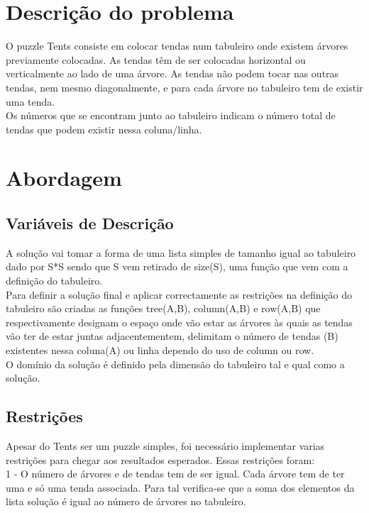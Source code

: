 \documentclass[runningheads,a4paper]{llncs}
\begin{document}
\section{Descrição do problema}
O puzzle Tents consiste em colocar tendas num tabuleiro onde existem árvores previamente colocadas. As tendas têm de ser colocadas horizontal ou verticalmente ao lado de uma árvore. As tendas não podem tocar nas outras tendas, nem mesmo diagonalmente, e para cada árvore no tabuleiro tem de existir uma tenda. \\
Os números que se encontram junto ao tabuleiro indicam o número total de tendas que podem existir nessa coluna/linha.\\


\section{Abordagem}

\subsection{Variáveis de Descrição}

A solução vai tomar a  forma de uma lista simples  de tamanho igual ao tabuleiro dado por S*S sendo que S vem retirado de size(S), uma função que vem com a definição do tabuleiro.\\
	Para definir a solução final e aplicar correctamente as restrições na definição do tabuleiro são criadas as funções tree(A,B),  column(A,B) e row(A,B) que respectivamente designam o espaço onde vão estar as árvores às quais as tendas vão ter de estar juntas adjacentementem, delimitam o número de tendas (B) existentes nessa coluna(A) ou linha dependo do uso de column ou row.\\
	O domínio da solução é definido  pela dimensão do tabuleiro tal e qual como a solução.




\subsection{Restrições}

Apesar do Tents ser um puzzle simples, foi necessário implementar varias restrições para chegar aos resultados esperados. Essas restrições foram:\\

1 - O número de árvores e de tendas tem de ser igual. 
Cada árvore tem de ter uma e só uma tenda associada. Para tal verifica-se que a soma dos elementos da lista solução é igual ao número de árvores no tabuleiro.\\
\end{document}
